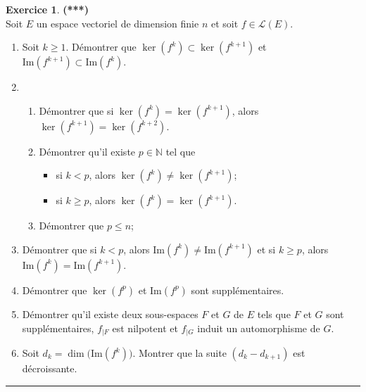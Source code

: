 \documentclass[a4paper,11pt]{article}
\theoremstyle{definition}
\newtheorem{exo}{Exercice} %
\begin{document}
\begin{exo}\textbf{(***)}\quad\\[0.25cm]%
	Soit $E$ un espace vectoriel de dimension finie $n$ et soit $f\in\mathcal L(E)$.
	\begin{enumerate}
		\item Soit $k\geq 1$. Démontrer que $\ker(f^{k})\subset \ker(f^{k+1})$ 
		et $\textrm{Im}(f^{k+1})\subset \textrm{Im}(f^k).$
		\item \begin{enumerate}
			\item Démontrer que si $\ker(f^k)=\ker(f^{k+1})$, alors $\ker(f^{k+1})= \ker(f^{k+2})$.
			\item Démontrer qu'il existe $p\in\mathbb N$ tel que
			\begin{itemize}
				\item si $k<p$, alors $\ker(f^k)\neq \ker(f^{k+1})$;
				\item si $k\geq p$, alors $\ker(f^k)= \ker(f^{k+1})$.
			\end{itemize}
			\item Démontrer que $p\leq n$;
		\end{enumerate}
		\item Démontrer que si $k<p$, alors $\textrm{Im}(f^k)\neq \textrm{Im}(f^{k+1})$ et
		si $k\geq p$, alors $\textrm{Im}(f^k)=\textrm{Im}(f^{k+1})$.
		\item Démontrer que $\ker(f^p)$ et $\textrm{Im}(f^p)$ sont supplémentaires.
		\item Démontrer qu'il existe deux sous-espaces $F$ et $G$ de $E$ tels que $F$ et $G$ sont supplémentaires, $f_{|F}$ est nilpotent et $f_{|G}$ induit un automorphisme de $G$.
		\item Soit $d_k=\dim\big(\textrm{Im}(f^k)\big)$. Montrer que la suite $(d_k-d_{k+1})$ est décroissante.
	\end{enumerate}
	
	\centering
	\rule{1\linewidth}{0.6pt}
\end{exo}
\end{document}
